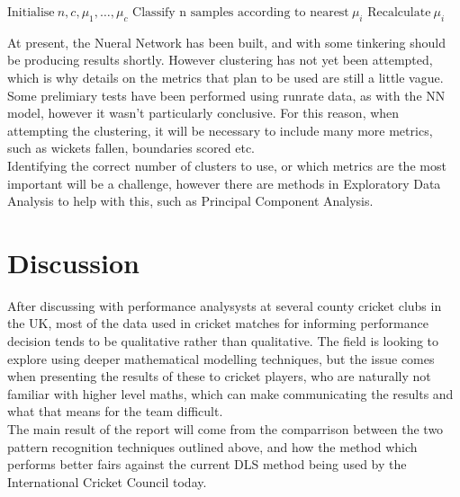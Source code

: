 \documentclass[11pt]{amsart}
\begin{document}
\begin{algorithmic}[1]
    \State $\text{Initialise} \ n,c,\mu_1,\ldots,\mu_c$
    \Repeat
        \State $\text{Classify n samples according to nearest} \ \mu_i$
        \State $\text{Recalculate} \ \mu_i$
\end{algorithmic}

At present, the Nueral Network has been built, and with some tinkering should be producing results shortly. However clustering has not yet been 
attempted, which is why details on the metrics that plan to be used are still a little vague. Some prelimiary tests have been performed using runrate
data, as with the NN model, however it wasn't particularly conclusive. For this reason, when attempting the clustering, it will be necessary to include 
many more metrics, such as wickets fallen, boundaries scored etc.  \\

Identifying the correct number of clusters to use, or which metrics are the most important will be a challenge, however there are methods 
in Exploratory Data Analysis to help with this, such as Principal Component Analysis. 

\section{Discussion}
After discussing with performance analysysts at several county cricket clubs in the UK, most of the data used in cricket 
matches for informing performance decision tends to be qualitative rather than qualitative. The field is looking to explore using deeper
mathematical modelling techniques, but the issue comes when presenting the results of these to cricket players, who are naturally not 
familiar with higher level maths, which can make communicating the results and what that means for the team difficult. \\

The main result of the report will come from the comparrison between the two pattern recognition techniques outlined above, and how 
the method which performs better fairs against the current DLS method being used by the International Cricket Council today.  


{}

\end{document}
